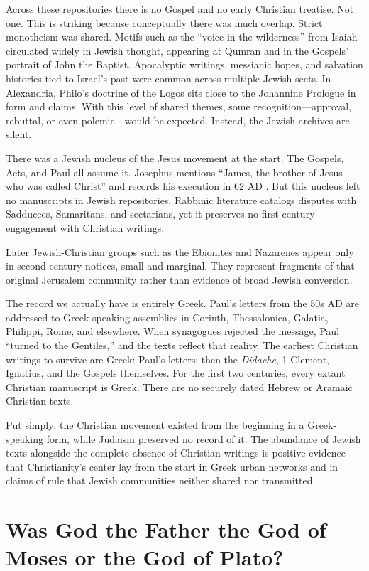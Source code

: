 Across these repositories there is no Gospel and no early Christian treatise.
Not one.
This is striking because conceptually there was much overlap.
Strict monotheism was shared.
Motifs such as the “voice in the wilderness” from Isaiah circulated widely in Jewish thought, appearing at Qumran and in the Gospels’ portrait of John the Baptist.
Apocalyptic writings, messianic hopes, and salvation histories tied to Israel’s past were common across multiple Jewish sects.
In Alexandria, Philo’s doctrine of the Logos sits close to the Johannine Prologue in form and claims.
With this level of shared themes, some recognition—approval, rebuttal, or even polemic—would be expected.
Instead, the Jewish archives are silent.

There was a Jewish nucleus of the Jesus movement at the start.
The Gospels, Acts, and Paul all assume it.
Josephus mentions “James, the brother of Jesus who was called Christ” and records his execution in 62 AD .
But this nucleus left no manuscripts in Jewish repositories.
Rabbinic literature catalogs disputes with Sadducees, Samaritans, and sectarians, yet it preserves no first-century engagement with Christian writings.

Later Jewish-Christian groups such as the Ebionites and Nazarenes appear only in second-century notices, small and marginal.
They represent fragments of that original Jerusalem community rather than evidence of broad Jewish conversion.

The record we actually have is entirely Greek.
Paul’s letters from the 50s AD are addressed to Greek-speaking assemblies in Corinth, Thessalonica, Galatia, Philippi, Rome, and elsewhere.
When synagogues rejected the message, Paul “turned to the Gentiles,” and the texts reflect that reality.
The earliest Christian writings to survive are Greek: Paul’s letters; then the \emph{Didache}, 1 Clement, Ignatius, and the Gospels themselves.
For the first two centuries, every extant Christian manuscript is Greek.
There are no securely dated Hebrew or Aramaic Christian texts.

Put simply: the Christian movement existed from the beginning in a Greek-speaking form, while Judaism preserved no record of it.
The abundance of Jewish texts alongside the complete absence of Christian writings is positive evidence that Christianity’s center lay from the start in Greek urban networks and in claims of rule that Jewish communities neither shared nor transmitted.

\section{Was God the Father the God of Moses or the God of Plato?}\label{sec:was-god-the-father-the-god-of-moses-or-the-god-of-plato}

